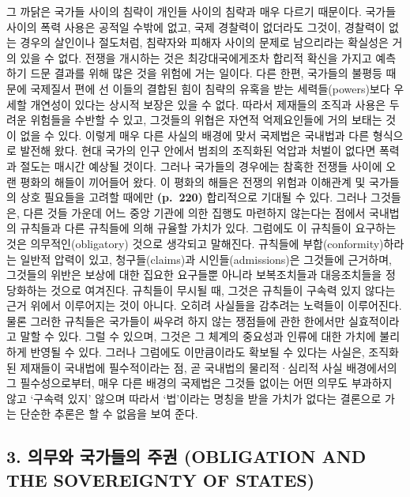그 까닭은 국가들 사이의 침략이 개인들 사이의 침략과 매우 다르기
때문이다. 국가들 사이의 폭력 사용은 공적일 수밖에 없고, 국제 경찰력이
없더라도 그것이, 경찰력이 없는 경우의 살인이나 절도처럼, 침략자와 피해자
사이의 문제로 남으리라는 확실성은 거의 있을 수 없다. 전쟁을 개시하는
것은 최강대국에게조차 합리적 확신을 가지고 예측하기 드문 결과를 위해
많은 것을 위험에 거는 일이다. 다른 한편, 국가들의 불평등 때문에 국제질서
편에 선 이들의 결합된 힘이 침략의 유혹을 받는 세력들(powers)보다 우세할
개연성이 있다는 상시적 보장은 있을 수 없다. 따라서 제재들의 조직과
사용은 두려운 위험들을 수반할 수 있고, 그것들의 위협은 자연적
억제요인들에 거의 보태는 것이 없을 수 있다. 이렇게 매우 다른 사실의
배경에 맞서 국제법은 국내법과 다른 형식으로 발전해 왔다. 현대 국가의
인구 안에서 범죄의 조직화된 억압과 처벌이 없다면 폭력과 절도는 매시간
예상될 것이다. 그러나 국가들의 경우에는 참혹한 전쟁들 사이에 오랜 평화의
해들이 끼어들어 왔다. 이 평화의 해들은 전쟁의 위험과 이해관계 및
국가들의 상호 필요들을 고려할 때에만 \textbf{(p.~220)} 합리적으로 기대될
수 있다. 그러나 그것들은, 다른 것들 가운데 어느 중앙 기관에 의한 집행도
마련하지 않는다는 점에서 국내법의 규칙들과 다른 규칙들에 의해 규율할
가치가 있다. 그럼에도 이 규칙들이 요구하는 것은 의무적인(obligatory)
것으로 생각되고 말해진다. 규칙들에 부합(conformity)하라는 일반적 압력이
있고, 청구들(claims)과 시인들(admissions)은 그것들에 근거하며, 그것들의
위반은 보상에 대한 집요한 요구들뿐 아니라 보복조치들과 대응조치들을
정당화하는 것으로 여겨진다. 규칙들이 무시될 때, 그것은 규칙들이 구속력
있지 않다는 근거 위에서 이루어지는 것이 아니다. 오히려 사실들을 감추려는
노력들이 이루어진다. 물론 그러한 규칙들은 국가들이 싸우려 하지 않는
쟁점들에 관한 한에서만 실효적이라고 말할 수 있다. 그럴 수 있으며, 그것은
그 체계의 중요성과 인류에 대한 가치에 불리하게 반영될 수 있다. 그러나
그럼에도 이만큼이라도 확보될 수 있다는 사실은, 조직화된 제재들이
국내법에 필수적이라는 점, 곧 국내법의 물리적·심리적 사실 배경에서의 그
필수성으로부터, 매우 다른 배경의 국제법은 그것들 없이는 어떤 의무도
부과하지 않고 ‘구속력 있지’ 않으며 따라서 ‘법’이라는 명칭을 받을 가치가
없다는 결론으로 가는 단순한 추론은 할 수 없음을 보여 준다.

\subsection{3. 의무와 국가들의 주권 (OBLIGATION AND THE SOVEREIGNTY OF
STATES)}\label{uxc758uxbb34uxc640-uxad6duxac00uxb4e4uxc758-uxc8fcuxad8c-obligation-and-the-sovereignty-of-states}

